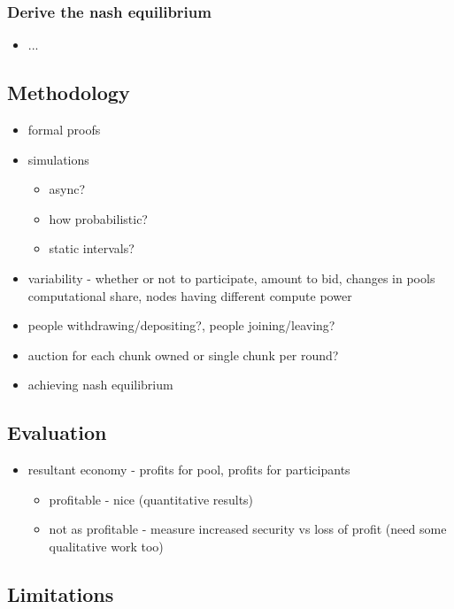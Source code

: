 \subsubsection{Derive the nash equilibrium}

\begin{itemize}
  \item ...
\end{itemize}

\subsection{Methodology}

\begin{itemize}
  \item formal proofs
  \item simulations
    \begin{itemize}
      \item async?
      \item how probabilistic?
      \item static intervals?
    \end{itemize}
  \item variability - whether or not to participate, amount to bid, changes in pools computational share, nodes having different compute power
  \item people withdrawing/depositing?, people joining/leaving?
  \item auction for each chunk owned or single chunk per round?
  \item achieving nash equilibrium
\end{itemize}

\subsection{Evaluation}

\begin{itemize}
  \item resultant economy - profits for pool, profits for participants
    \begin{itemize}
      \item profitable - nice (quantitative results)
      \item not as profitable - measure increased security vs loss of profit (need some qualitative work too)
    \end{itemize}
\end{itemize}

\subsection{Limitations}

